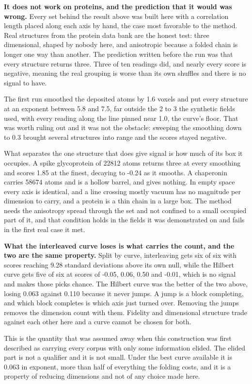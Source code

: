 \textbf{It does not work on proteins, and the prediction that it would was wrong.} Every set behind the result above was built here with a correlation length placed along each axis by hand, the case most favorable to the method. Real structures from the protein data bank are the honest test: three dimensional, shaped by nobody here, and anisotropic because a folded chain is longer one way than another. The prediction written before the run was that every structure returns three. Three of ten readings did, and nearly every score is negative, meaning the real grouping is worse than its own shuffles and there is no signal to have.

The first run smoothed the deposited atoms by 1.6 voxels and put every structure at an exponent between 5.8 and 7.5, far outside the 2 to 3 the synthetic fields used, with every reading along the line pinned near 1.0, the curve's floor. That was worth ruling out and it was not the obstacle: sweeping the smoothing down to 0.3 brought several structures into range and the scores stayed negative.

What separates the one structure that does give signal is how much of its box it occupies. A spike glycoprotein of 22812 atoms returns three at every smoothing and scores 1.85 at the finest, decaying to -0.24 as it smooths. A chaperonin carries 58674 atoms and is a hollow barrel, and gives nothing. In empty space every axis is identical, and a line crossing mostly vacuum has no magnitude per dimension to carry, and a protein is a thin chain in a large box. The method needs the anisotropy spread through the set and not confined to a small occupied part of it, and that condition holds in the fields it was demonstrated on and fails in the first real case it met.

\textbf{What the interleaved curve loses is what carries the count, and the two are the same property.} Split by curve, interleaving gets six of six with scores reaching 9.28 standard deviations above its own null, while the Hilbert curve gets five of six at scores of -0.05, 0.06, 0.50 and -0.01, which is no signal and makes those picks chance. The Hilbert curve was the better of the two above, losing 0.063 against 0.110 because it never jumps. A jump is a block completing, and which block completes is which axis just turned over. Removing the jumps removes the dimension count with them. Fidelity and dimensional structure trade against each other here and a curve cannot be chosen for both.

This is the quantity that was assumed away when this construction was first described as carrying every corpus with only some information elided. The elided part is not a qualifier and it is not small. Under the best curve available it is 0.063 in exponent, more than half of everything the folding costs, and it is a property of reducing dimensions and not of any choice made here.

